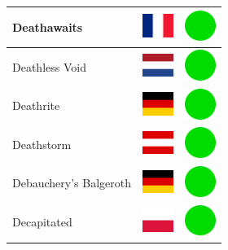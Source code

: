 \documentclass[12pt, a4paper, twoside]{report}
\begin{document}
\begin{center}
\begin{longtable}{|p{5cm}|p{2cm}|p{2cm}|}
 Deathawaits                                                & \includegraphics[width=1cm]{../4x3/fr} &   \includegraphics[width=1cm]{../likes/y} \\ \hline
 Deathless Void                                             & \includegraphics[width=1cm]{../4x3/nl} &   \includegraphics[width=1cm]{../likes/y} \\ \hline
 Deathrite                                                  & \includegraphics[width=1cm]{../4x3/de} &   \includegraphics[width=1cm]{../likes/y} \\ \hline
 Deathstorm                                                 & \includegraphics[width=1cm]{../4x3/at} &   \includegraphics[width=1cm]{../likes/y} \\ \hline
 Debauchery's Balgeroth                                     & \includegraphics[width=1cm]{../4x3/de} &   \includegraphics[width=1cm]{../likes/y} \\ \hline
 Decapitated                                                & \includegraphics[width=1cm]{../4x3/pl} &   \includegraphics[width=1cm]{../likes/y} \\ \hline

\end{longtable}
\end{center}
\end{document}
